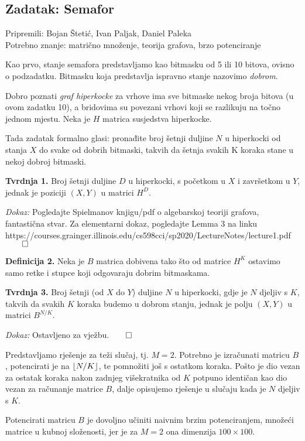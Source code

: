 \subsection*{Zadatak: Semafor}
\textsf{Pripremili: Bojan Štetić, Ivan Paljak, Daniel Paleka}\\
\textsf{Potrebno znanje: matrično množenje, teorija grafova, brzo potenciranje}

Kao prvo, stanje semafora predstavljamo kao bitmasku od 5 ili 10 bitova, ovisno
o podzadatku. Bitmasku koja predstavlja ispravno stanje nazovimo
\emph{dobrom}.

Dobro poznati \emph{graf hiperkocke} za vrhove ima sve bitmaske nekog
broja bitova (u ovom zadatku 10), a bridovima su povezani vrhovi koji se
razlikuju na točno jednom mjestu. Neka je $H$ matrica susjedstva hiperkocke.

Tada zadatak formalno glasi: pronađite broj šetnji duljine $N$ u hiperkocki 
od stanja $X$ do svake od dobrih bitmaski, takvih da šetnja svakih K koraka
stane u nekoj dobroj bitmaski.

\textbf{Tvrdnja 1.} Broj šetnji duljine $D$ u hiperkocki, s početkom u $X$ 
i završetkom u $Y$, jednak je poziciji $(X, Y)$ u matrici $H^D$.

\textit{Dokaz:} Pogledajte Spielmanov knjigu/pdf o algebarskoj teoriji grafova,
fantastična stvar. Za elementarni dokaz, pogledajte Lemma 3 na linku
\\
{https://courses.grainger.illinois.edu/cs598cci/sp2020/LectureNotes/lecture1.pdf}
$\qed$

\textbf{Definicija 2.} Neka je $B$ matrica dobivena tako što od matrice $H^K$ 
ostavimo samo retke i stupce koji odgovaraju dobrim bitmaskama.

\textbf{Tvrdnja 3.} Broj šetnji (od $X$ do $Y$) duljine $N$ u hiperkocki, gdje je $N$ djeljiv
s $K$, takvih da svakih $K$ koraka budemo u dobrom stanju, jednak je 
polju $(X, Y)$ u matrici $B^{N/K}$.

\textit{Dokaz:} Ostavljeno za vježbu.$\qed$

Predstavljamo rješenje za teži slučaj, tj. $M=2$. 
Potrebno je izračunati matricu $B$, potencirati je na $\lfloor N/K\rfloor$, te
pomnožiti još s ostatkom koraka. Pošto je dio vezan za ostatak koraka
nakon zadnjeg višekratnika od $K$ potpuno identičan kao
dio vezan za računanje matrice $B$, dalje opisujemo rješenje
u slučaju kada je $N$ djeljiv s $K$.

Potencirati matricu $B$ je dovoljno učiniti naivnim brzim potenciranjem,
množeći matrice u kubnoj složenosti, jer je za $M=2$ ona dimenzija $100 \times 100$.

